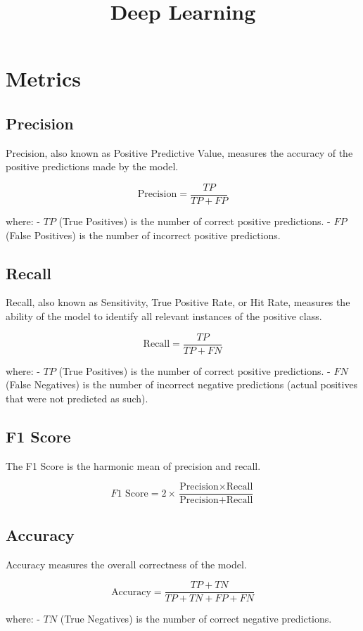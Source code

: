 \documentclass{article}
\title{Deep Learning}
\author{}
\begin{document}
\maketitle

\section{Metrics}

\subsection{Precision}
Precision, also known as Positive Predictive Value, measures the accuracy of the positive predictions made by the model.

\[
\text{Precision} = \frac{TP}{TP + FP}
\]

where:
- \( TP \) (True Positives) is the number of correct positive predictions.
- \( FP \) (False Positives) is the number of incorrect positive predictions.

\subsection{Recall}
Recall, also known as Sensitivity, True Positive Rate, or Hit Rate, measures the ability of the model to identify all relevant instances of the positive class.

\[
\text{Recall} = \frac{TP}{TP + FN}
\]

where:
- \( TP \) (True Positives) is the number of correct positive predictions.
- \( FN \) (False Negatives) is the number of incorrect negative predictions (actual positives that were not predicted as such).

\subsection{F1 Score}
The F1 Score is the harmonic mean of precision and recall.

\[
F1 \text{ Score} = 2 \times \frac{\text{Precision} \times \text{Recall}}{\text{Precision} + \text{Recall}}
\]

\subsection{Accuracy}
Accuracy measures the overall correctness of the model.

\[
\text{Accuracy} = \frac{TP + TN}{TP + TN + FP + FN}
\]

where:
- \( TN \) (True Negatives) is the number of correct negative predictions.
\end{document}
